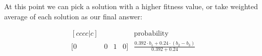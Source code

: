 At this point we can pick a solution with a higher fitness value, or take weighted average of each solution as our final answer:

\begin{equation}
\begin{matrix}[cccc|c]
     &  &  &  & \mbox{probability}\\
    \hline
    [0 & 0 & 1 & 0] & \frac{0.392 \cdot b_1 + 0.24 \cdot (b_2 - b_3)}{0.392+0.24}\\
\end{matrix}
\end{equation}


